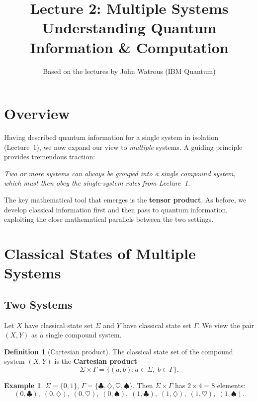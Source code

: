 \documentclass[11pt]{article}
\title{\textbf{Lecture 2: Multiple Systems} \\ \large Understanding Quantum Information \& Computation}
\author{Based on the lectures by John Watrous (IBM Quantum)}
\date{}
\theoremstyle{definition}
\newtheorem{definition}{Definition}[section]
\newtheorem{example}{Example}[section]
\begin{document}
\maketitle
\tableofcontents
\newpage

\section{Overview}

Having described quantum information for a single system in isolation (Lecture~1), we now expand our view to \emph{multiple} systems.  A guiding principle provides tremendous traction:

\begin{center}
\emph{Two or more systems can always be grouped into a single compound system, which must then obey the single-system rules from Lecture~1.}
\end{center}

The key mathematical tool that emerges is the \textbf{tensor product}.  As before, we develop classical information first and then pass to quantum information, exploiting the close mathematical parallels between the two settings.

\section{Classical States of Multiple Systems}

\subsection{Two Systems}

Let $X$ have classical state set $\Sigma$ and $Y$ have classical state set $\Gamma$.  We view the pair $(X,Y)$ as a single compound system.

\begin{definition}[Cartesian product]
The classical state set of the compound system $(X,Y)$ is the \textbf{Cartesian product}
\[
    \Sigma\times\Gamma = \bigl\{(a,b) : a\in\Sigma,\; b\in\Gamma\bigr\}.
\]
\end{definition}

\begin{example}
$\Sigma=\{0,1\}$, $\Gamma=\{\clubsuit,\diamondsuit,\heartsuit,\spadesuit\}$.  Then $\Sigma\times\Gamma$ has $2\times 4=8$ elements:
\[
    (0,\clubsuit),\;(0,\diamondsuit),\;(0,\heartsuit),\;(0,\spadesuit),\;
    (1,\clubsuit),\;(1,\diamondsuit),\;(1,\heartsuit),\;(1,\spadesuit).
\]
\end{example}
\end{document}
